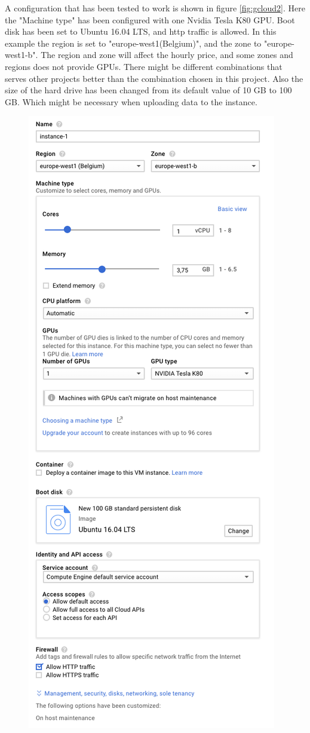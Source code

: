 \newpage
A configuration that has been tested to work is shown in figure \ref{fig:gcloud2}. Here the "Machine type" has been configured with one Nvidia Tesla K80 GPU. Boot disk has been set to Ubuntu 16.04 LTS, and http traffic is allowed. In this example the region is set to "europe-west1(Belgium)", and the zone to "europe-west1-b". The region and zone will affect the hourly price, and some zones and regions does not provide GPUs. There might be different combinations that serves other projects better than the combination chosen in this project. Also the size of the hard drive has been changed from its default value of 10 GB to 100 GB. Which might be necessary when uploading data to the instance. 

\begin{figure}
    \centering
    \includegraphics[scale=0.9]{images/gcloud_2.png}

\end{figure}
